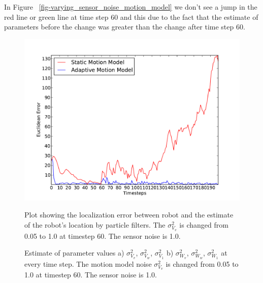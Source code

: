 \documentclass[12pt]{dalcsthesis}
\begin{document}
In Figure ~\ref{fig-varying_sensor_noise_motion_model} we don't see a jump in the red line or green line at time step 60 and this due to the fact that the estimate of parameters before the change was greater than the change after time step 60. 

\begin{figure}[!h]
  \centering
     {\includegraphics[height = 3.0 in]{./plots/200_005_10_s_10.pdf}}
  \caption{\label{fig-varying_sensor_noise_1.0} Plot showing the localization error between robot and the estimate of the robot's location by particle filters. The $\sigma_{V_{v}}^{2}$ is changed from 0.05 to 1.0 at timestep 60. The sensor noise is 1.0.}
\end{figure}

\begin{figure}[!h]
  \centering
     \qquad
  \caption{\label{fig-varying_sensor_noise_motion_model_1.0} Estimate of parameter values a) $\sigma_{V_{v}}^{2}$, $\sigma_{V_{w}}^{2}$,  $\sigma_{V_{1}}^{2}$ b)  $\sigma_{W_{v}}^{2}$, $\sigma_{W_{w}}^{2}$, $\sigma_{W_{1}}^{2}$ at every time step. The motion model noise $\sigma_{V_{v}}^{2}$ is changed from 0.05 to 1.0 at timestep 60. The sensor noise is 1.0.}
\end{figure}  
\end{document}
